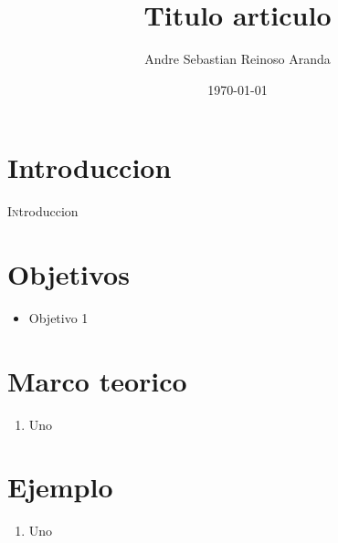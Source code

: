 \documentclass[twoside,twocolumn]{article}
\title{Titulo articulo}
\author{Andre Sebastian Reinoso Aranda\\
}
\date{\today}
\begin{document}
\maketitle


\section{Introduccion}
\lettrine[nindent=0em,lines=3]{I}ntroduccion







\section{Objetivos}

\begin{itemize}
\item Objetivo 1

\end{itemize}




\section{Marco teorico}

\begin{enumerate}

 \item Uno


\end{enumerate}




\section{Ejemplo}
\begin{enumerate}

 \item Uno
   
\end{enumerate}
\end{document}

